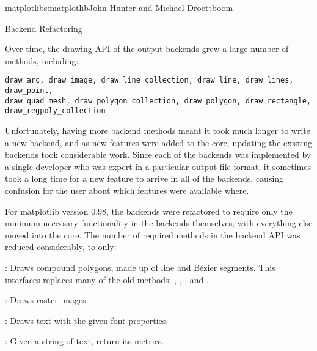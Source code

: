 \begin{aosachapter}{matplotlib}{s:matplotlib}{John Hunter and Michael Droettboom}
\begin{aosasect1}{Backend Refactoring}


Over time, the drawing API of the output backends grew a large number
of methods, including:

\begin{verbatim}
draw_arc, draw_image, draw_line_collection, draw_line, draw_lines, draw_point,
draw_quad_mesh, draw_polygon_collection, draw_polygon, draw_rectangle,
draw_regpoly_collection
\end{verbatim}

Unfortunately, having more backend methods meant it took much longer
to write a new backend, and as new features were added to the core,
updating the existing backends took considerable work.  Since each of
the backends was implemented by a single developer who was expert in a
particular output file format, it sometimes took a long time for a new
feature to arrive in all of the backends, causing confusion for the
user about which features were available where.

For matplotlib version 0.98, the backends were refactored to require
only the minimum necessary functionality in the backends themselves,
with everything else moved into the core.  The number of required
methods in the backend API was reduced considerably, to only:

\begin{aosaitemize}

  \item {}: Draws compound polygons, made up of line and
    B\'ezier segments.  This interfaces replaces many of the old
    methods: , , ,
    and .

  \item {}: Draws raster images.

  \item {}: Draws text with the given font properties.

  \item {}: Given a string of
    text, return its metrics.

\end{aosaitemize}


\end{aosasect1}
\end{aosachapter}
